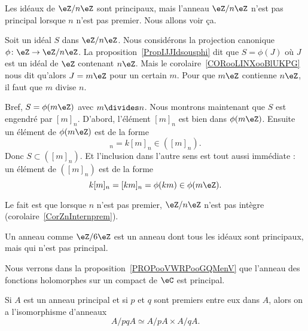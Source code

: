 \begin{example}       \label{EXooCJRPooYkWdyr}

	Les idéaux de \( \eZ/n\eZ\) sont principaux, mais l'anneau \( \eZ/n\eZ\) n'est pas principal lorsque \( n\) n'est pas premier. Nous allons voir ça.

	\begin{subproof}
		Soit un idéal \( S\) dans \( \eZ/n\eZ\). Nous considérons la projection canonique \( \phi\colon \eZ\to \eZ/n\eZ\). La proposition~\ref{PropIJJIdsousphi} dit que  \( S=\phi(J)\) où \( J\) est un idéal de \( \eZ\) contenant \( n\eZ\). Mais le corolaire~\ref{CORooLINXooBlUKPG} nous dit qu'alors \( J=m\eZ\) pour un certain \( m\). Pour que \( m\eZ\) contienne \( n\eZ\), il faut que \( m\) divise \( n\).

		Bref, \( S=\phi(m\eZ)\) avec \( m\divides n\). Nous montrons maintenant que \( S\) est engendré par \( [m]_n\). D'abord, l'élément \( [m]_n\) est bien dans \( \phi(m\eZ)\). Ensuite un élément de \( \phi(m\eZ)\) est de la forme
		\begin{equation}
			[km]_n=k[m]_n\in ([m]_n).
		\end{equation}
		Donc \( S\subset ([m]_n)\). Et l'inclusion dans l'autre sens est tout aussi immédiate : un élément de \( ([m]_n)\) est de la forme
		\begin{equation}
			k[m]_n=[km]_n=\phi(km)\in \phi(m\eZ).
		\end{equation}

		Le fait est que lorsque \( n\) n'est pas premier, \( \eZ/n\eZ\) n'est pas intègre (corolaire~\ref{CorZnInternprem}).

		\spitem[Moralité]
		Un anneau comme \( \eZ/6\eZ\) est un anneau dont tous les idéaux sont principaux, mais qui n'est pas principal.
	\end{subproof}
\end{example}

\begin{example}
	Nous verrons dans la proposition~\ref{PROPooVWRPooGQMenV} que l'anneau des fonctions holomorphes sur un compact de \( \eC\) est principal.
\end{example}


\begin{theorem}        \label{ThofPXwiM}
	Si \( A\) est un anneau principal et si \( p\) et \( q\) sont premiers entre eux dans \( A\), alors on a l'isomorphisme d'anneaux
	\begin{equation}
		A/pqA\simeq A/pA\times A/qA.
	\end{equation}
\end{theorem}


